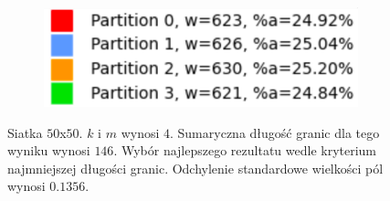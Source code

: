 \begin{figure}[h]
\begin{subfigure}{.33\textwidth}
    \caption[short]{}
\end{subfigure}
\begin{subfigure}{.33\textwidth}
    \centering
    \includegraphics[width=0.9\linewidth]{images/results/m/1/results}
    \caption[short]{}
\end{subfigure}
\caption{Siatka $50$x$50$. $k$ i $m$ wynosi $4$.
Sumaryczna długość granic dla tego wyniku wynosi $146$.
Wybór najlepszego rezultatu wedle kryterium najmniejszej długości granic.
Odchylenie standardowe wielkości pól wynosi $0.1356$.}
\label{result:m:1}
\end{figure}

